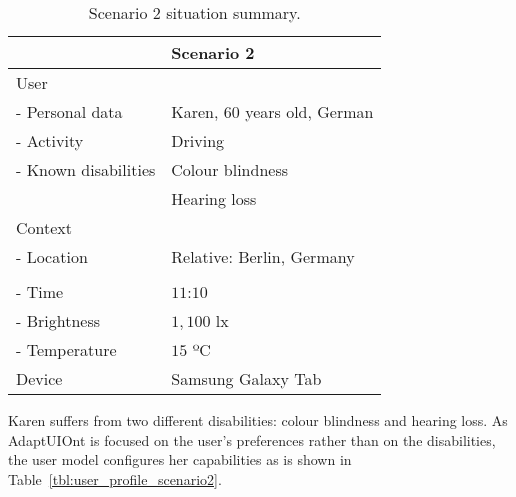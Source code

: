 \begin{table}
 \caption{Scenario 2 situation summary.}
 \label{tbl:scenario2}
 \footnotesize
 \centering
\begin{tabular}{l l}
  \hline 
				& \textbf{Scenario 2}		\\
  \hline
  User \\
  \qquad - Personal data 	& Karen, $60$ years old, German \\
  \qquad - Activity	 	& Driving 			\\
  \qquad - Known disabilities 	& Colour blindness 		\\
				& Hearing loss 			\\
  Context \\
  \qquad - Location 		& Relative: Berlin, Germany  	\\
				& 				\\
  \qquad - Time			& $11$:$10$ 			\\
  \qquad - Brightness		& $1,100$ \ac{lx} 		\\
  \qquad - Temperature		& $15$ ºC 			\\
  Device 			& Samsung Galaxy Tab 	 	\\
  \hline
\end{tabular}
\end{table}

Karen suffers from two different disabilities: colour blindness and hearing 
loss. As AdaptUIOnt is focused on the user’s preferences rather than on the 
disabilities, the user model configures her capabilities as is shown in 
Table~\ref{tbl:user_profile_scenario2}. 

